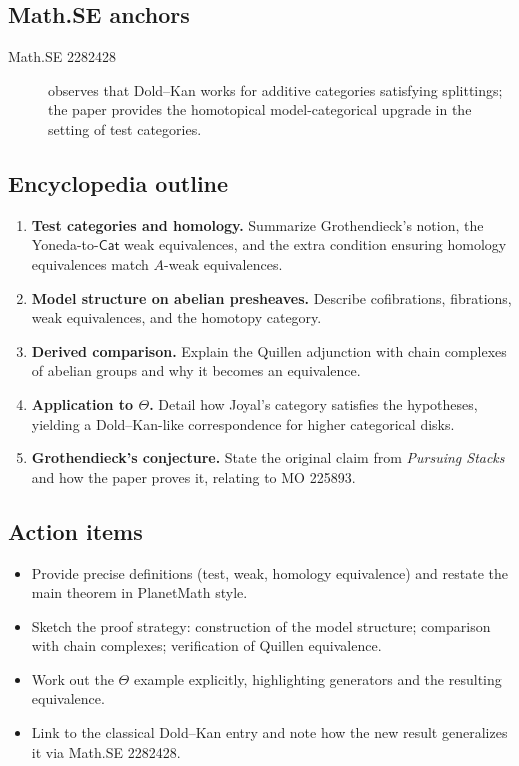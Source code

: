 \subsection*{Math.SE anchors}
\begin{description}
  \item[Math.SE 2282428] observes that Dold--Kan works for additive categories satisfying splittings; the paper provides the homotopical model-categorical upgrade in the setting of test categories.
\end{description}
\subsection*{Encyclopedia outline}
\begin{enumerate}
  \item \textbf{Test categories and homology.} Summarize Grothendieck's notion, the Yoneda-to-$\mathsf{Cat}$ weak equivalences, and the extra condition ensuring homology equivalences match $A$-weak equivalences.
  \item \textbf{Model structure on abelian presheaves.} Describe cofibrations, fibrations, weak equivalences, and the homotopy category.
  \item \textbf{Derived comparison.} Explain the Quillen adjunction with chain complexes of abelian groups and why it becomes an equivalence.
  \item \textbf{Application to $\Theta$.} Detail how Joyal's category satisfies the hypotheses, yielding a Dold--Kan-like correspondence for higher categorical disks.
  \item \textbf{Grothendieck's conjecture.} State the original claim from \emph{Pursuing Stacks} and how the paper proves it, relating to MO 225893.
\end{enumerate}
\subsection*{Action items}
\begin{itemize}
  \item Provide precise definitions (test, weak, homology equivalence) and restate the main theorem in PlanetMath style.
  \item Sketch the proof strategy: construction of the model structure; comparison with chain complexes; verification of Quillen equivalence.
  \item Work out the $\Theta$ example explicitly, highlighting generators and the resulting equivalence.
  \item Link to the classical Dold--Kan entry and note how the new result generalizes it via Math.SE 2282428.
\end{itemize}
